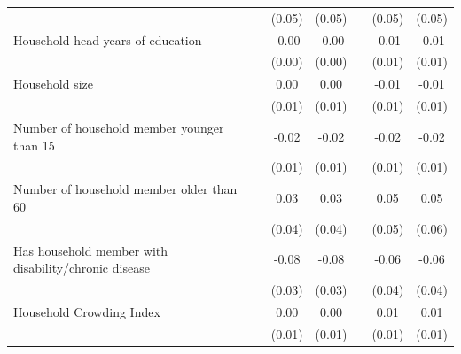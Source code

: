 {\begin{tabular}{l*{6}{c}}
                    &                     &      (0.05)         &      (0.05)         &                     &      (0.05)         &      (0.05)         \\
Household head years of education&                     &       -0.00         &       -0.00         &                     &       -0.01         &       -0.01         \\
                    &                     &      (0.00)         &      (0.00)         &                     &      (0.01)         &      (0.01)         \\
Household size      &                     &        0.00         &        0.00         &                     &       -0.01         &       -0.01         \\
                    &                     &      (0.01)         &      (0.01)         &                     &      (0.01)         &      (0.01)         \\
Number of household member younger than 15&                     &       -0.02\sym{*}  &       -0.02\sym{*}  &                     &       -0.02         &       -0.02         \\
                    &                     &      (0.01)         &      (0.01)         &                     &      (0.01)         &      (0.01)         \\
Number of household member older than 60&                     &        0.03         &        0.03         &                     &        0.05         &        0.05         \\
                    &                     &      (0.04)         &      (0.04)         &                     &      (0.05)         &      (0.06)         \\
Has household member with disability/chronic disease&                     &       -0.08\sym{**} &       -0.08\sym{**} &                     &       -0.06         &       -0.06         \\
                    &                     &      (0.03)         &      (0.03)         &                     &      (0.04)         &      (0.04)         \\
Household Crowding Index&                     &        0.00         &        0.00         &                     &        0.01         &        0.01         \\
                    &                     &      (0.01)         &      (0.01)         &                     &      (0.01)         &      (0.01)         \\

\end{tabular}}

